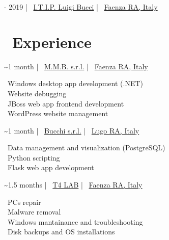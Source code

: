 \documentclass{article}
\begin{document}
\begin{paracol}{2}
\begin{tcolorbox}[title=\faBook \ High School Diploma in Information Technology,colback=white,arc=0pt]
     - 2019 \hfill | \hfill
    \faSchool \ \href{https://www.itipfaenza.edu.it/}{I.T.I.P. Luigi Bucci} \hfill | \hfill
    \faCity \ \href{https://www.openstreetmap.org/relation/2227656}{Faenza RA, Italy}
\end{tcolorbox}

%
%

\vfill

\section*{\faBriefcase \ Experience}

\begin{tcolorbox}[title=\faLaptopCode \ Software Developer Internship,colback=white,arc=0pt]
     \textasciitilde 1 month \hfill | \hfill
    \faBuilding \ \href{https://www.mmbsoftware.it/portalemmb/en/home}{M.M.B. s.r.l.} \hfill | \hfill
    \faCity \ \href{https://www.openstreetmap.org/node/1864397767}{Faenza RA, Italy}

    \tcblower

    \faDesktop \ Windows desktop app development (.NET) \\
    \faBug \ Website debugging \\
    \faCoffee \ JBoss web app frontend development \\
    \faWordpress \ WordPress website management
\end{tcolorbox}

\begin{tcolorbox}[title=\faLaptopCode \ Software Developer Internship,colback=white,arc=0pt]
     \textasciitilde 1 month \hfill | \hfill
    \faIndustry \ \href{http://www.bucchi.it/en/}{Bucchi s.r.l.} \hfill | \hfill
    \faCity \ \href{https://www.openstreetmap.org/node/4752486846}{Lugo RA, Italy}

    \tcblower

    \faDatabase \ Data management and visualization (PostgreSQL) \\
    \faPython \ Python scripting \\
    \faFlask \ Flask web app development
\end{tcolorbox}

\begin{tcolorbox}[title=\faTools \ Computer Technician Internship,colback=white,arc=0pt]
     \textasciitilde 1.5 months \hfill | \hfill
    \faBuilding \ \href{https://www.t4lab.it/}{T4 LAB} \hfill | \hfill
    \faCity \ \href{https://www.openstreetmap.org/node/4751590216}{Faenza RA, Italy}

    \tcblower

    \faLaptop \ PCs repair \\
    \faShieldVirus \ Malware removal \\
    \faRecycle \ Windows mantainance and troubleshooting \\
    \faHdd \ Disk backups and OS installations
\end{tcolorbox}

\end{paracol}
\end{document}
